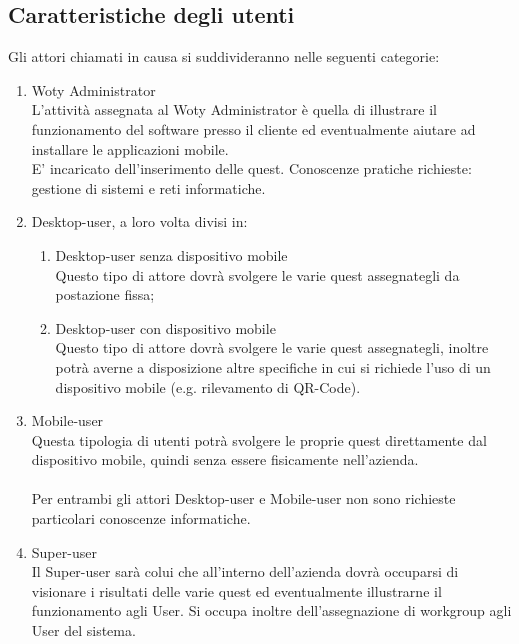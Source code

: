 \documentclass[10pt,a4paper]{article}
\begin{document}
\newpage

\subsection{Caratteristiche degli utenti}
Gli attori chiamati in causa si suddivideranno nelle seguenti categorie:

\begin{enumerate}

\item Woty Administrator\\
L'attività assegnata al Woty Administrator è quella di illustrare il funzionamento del software presso il cliente ed eventualmente aiutare ad installare le applicazioni mobile.\\
E' incaricato dell'inserimento delle quest. Conoscenze pratiche richieste: gestione di sistemi e reti informatiche.\\

\item Desktop-user, a loro volta divisi in:

\begin{enumerate}

\item Desktop-user senza dispositivo mobile\\
Questo tipo di attore dovrà svolgere le varie quest assegnategli da postazione fissa;

\item Desktop-user con dispositivo mobile\\
Questo tipo di attore dovrà svolgere le varie quest assegnategli, inoltre potrà averne a disposizione altre specifiche in cui si richiede l'uso di un dispositivo mobile (e.g. rilevamento di QR-Code).

\end{enumerate}

\item Mobile-user\\
Questa tipologia di utenti potrà svolgere le proprie quest direttamente dal dispositivo mobile, quindi senza essere fisicamente nell'azienda.

\paragraph{}
Per entrambi gli attori Desktop-user e Mobile-user non sono richieste particolari conoscenze informatiche.

\item Super-user\\
Il Super-user sarà colui che all'interno dell'azienda dovrà occuparsi di visionare i risultati delle varie quest ed eventualmente illustrarne il funzionamento agli User. Si occupa inoltre dell'assegnazione di workgroup agli User del sistema.

\end{enumerate}
\end{document}

